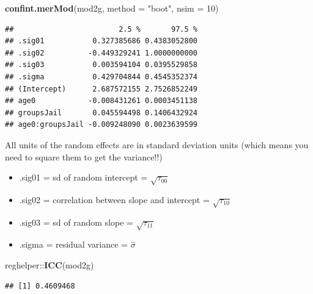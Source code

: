 \documentclass[ignorenonframetext,]{beamer}
\newenvironment{Shaded}{\begin{snugshade}}{\end{snugshade}}
\newcommand{\KeywordTok}[1]{\textcolor[rgb]{0.13,0.29,0.53}{\textbf{{#1}}}}
\newcommand{\DataTypeTok}[1]{\textcolor[rgb]{0.13,0.29,0.53}{{#1}}}
\newcommand{\DecValTok}[1]{\textcolor[rgb]{0.00,0.00,0.81}{{#1}}}
\newcommand{\StringTok}[1]{\textcolor[rgb]{0.31,0.60,0.02}{{#1}}}
\newcommand{\NormalTok}[1]{{#1}}
\begin{document}
\begin{frame}[fragile]

\footnotesize

\begin{Shaded}
\begin{Highlighting}[]
\KeywordTok{confint.merMod}\NormalTok{(mod2g, }\DataTypeTok{method =} \StringTok{"boot"}\NormalTok{, }\DataTypeTok{nsim =} \DecValTok{10}\NormalTok{)}
\end{Highlighting}
\end{Shaded}

\begin{verbatim}
##                        2.5 %       97.5 %
## .sig01           0.327385686 0.4383052800
## .sig02          -0.449329241 1.0000000000
## .sig03           0.003594104 0.0395529858
## .sigma           0.429704844 0.4545352374
## (Intercept)      2.687572155 2.7526852249
## age0            -0.008431261 0.0003451138
## groupsJail       0.045594498 0.1406432924
## age0:groupsJail -0.009248090 0.0023639599
\end{verbatim}

All units of the random effects are in standard deviation units (which
means you need to square them to get the variance!!)\\

\begin{itemize}
  \item .sig01 = sd of random intercept = $\sqrt{\tau_{00}}$  
  \item .sig02 = correlation between slope and intercept = $\sqrt{\tau_{10}}$  
  \item .sig03 = sd of random slope = $\sqrt{\tau_{11}}$  
  \item .sigma = residual variance = $\hat{\sigma}$  
\end{itemize}

\end{frame}

\begin{frame}[fragile]

\small

\begin{Shaded}
\begin{Highlighting}[]
\NormalTok{reghelper::}\KeywordTok{ICC}\NormalTok{(mod2g)}
\end{Highlighting}
\end{Shaded}

\begin{verbatim}
## [1] 0.4609468
\end{verbatim}

\end{frame}
\end{document}
